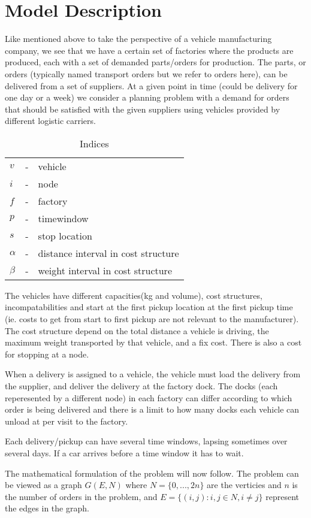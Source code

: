 \documentclass[../main.tex]{subfiles}
\begin{document}
                                                

\chapter{Model Description}
\label{ch:mm}
Like mentioned above to take the perspective of a vehicle manufacturing company, we see that we have a certain set of factories where the products are produced, each with a set of demanded parts/orders for production.
The parts, or orders (typically named transport orders but we refer to orders here), can be delivered from a set of suppliers.
At a given point in time (could be delivery for one day or a week) we consider a planning problem with a demand for orders that should be satisfied with the given suppliers using vehicles provided by different logistic carriers.
\linebreak

\begin{table}[h]
\begin{tabular}{l c l }
    $v      $ &-& vehicle     					        \\
    $i      $ &-& node 	        				        \\
    $f      $ &-& factory 		                                \\
    $p      $ &-& timewindow                    		        \\
    $s      $ &-& stop location 				        \\
    $\alpha $ &-& distance interval in cost structure		        \\
    $\beta  $ &-& weight interval in cost structure		        \\
\end{tabular}
    \caption{Indices}
    \label{tab:ind}
\end{table}

The vehicles have different capacities(kg and volume), cost structures, incompatabilities and start at the first pickup location at the first pickup time (ie. costs to get from start to first pickup are not relevant to the manufacturer).
The cost structure depend on the total distance a vehicle is driving, the maximum weight transported by that vehicle, and a fix cost. There is also a cost for stopping at a node. \par
When a delivery is assigned to a vehicle, the vehicle must load the delivery from the supplier, and deliver the delivery at the factory dock.
The docks (each reperesented by a different node) in each factory can differ according to which order is being delivered and there is a limit to how many docks each vehicle can unload at per visit to the factory. \par
Each delivery/pickup can have several time windows, lapsing sometimes over several days. If a car arrives before a time window it has to wait. \par
The mathematical formulation of the problem will now follow. 
The problem can be viewed as a graph $G(E,N)$ where $N=\{0,...,2n\}$ are the verticies and $n$ is the number of orders in the problem, and $E=\{(i,j): i,j \in N, i \neq j\}$ represent the edges in the graph.
\linebreak
\end{document}
